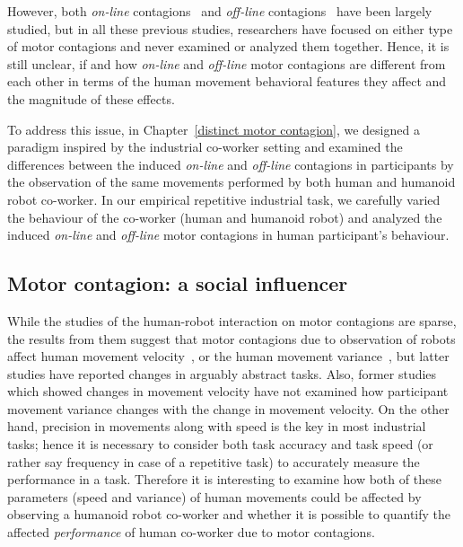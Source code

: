 However, both \textit{on-line} contagions~\cite{Kupferberg:Methods:2009, Oztop:RAS_ICHR:2004, Chaminade:JPP:2009, Kupferberg:PlosOne:2012, Brass:ActaPsych:2001, Press:CBR:2005} and \textit{off-line} contagions~\cite{Noy:B&C:2009, Kilner:SocialNeuro:2007, Bisio:PlosOne:2010, heyes2011automatic, Ikegami:SciReport:2014, Ikegami:elife:2018} have been largely studied,  but in all these previous studies, researchers have focused on either type of motor contagions and never examined or analyzed them together. Hence, it is still unclear, if and how \textit{on-line} and \textit{off-line} motor contagions are different from each other in terms of the human movement behavioral features they affect and the magnitude of these effects. 

To address this issue, in Chapter~\ref{distinct motor contagion}, we designed a paradigm inspired by the industrial co-worker setting and examined the differences between the induced \textit{on-line} and \textit{off-line} contagions in participants by the observation of the same movements performed by both human and humanoid robot co-worker. In our empirical repetitive industrial task, we carefully varied the behaviour of the co-worker (human and humanoid robot) and analyzed the induced \textit{on-line} and \textit{off-line} motor contagions in human participant's behaviour.


\subsection{Motor contagion: a social influencer}\label{influence performance}

While the studies of the human-robot interaction on motor contagions are sparse, the results from them suggest that motor contagions due to observation of robots affect human movement velocity~\cite{Noy:B&C:2009, Kilner:SocialNeuro:2007, Bisio:PlosOne:2010, Bisio:PlosOne:2014}, or the human movement variance~\cite{Kupferberg:Methods:2009, Kupferberg:PlosOne:2012, Brass:ActaPsych:2001, Press:CBR:2005}, but latter studies have reported changes in arguably abstract tasks. Also, former studies which showed changes in movement velocity have not examined how participant movement variance changes with the change in movement velocity. On the other hand, precision in movements along with speed is the key in most industrial tasks; hence it is necessary to consider both task accuracy and task speed (or rather say frequency in case of a repetitive task) to accurately measure the performance in a task. Therefore it is interesting to examine how both of these parameters (speed and variance) of human movements could be affected by observing a humanoid robot co-worker and whether it is possible to quantify the affected \textit{performance} of human co-worker due to motor contagions.


